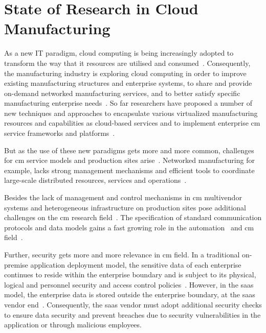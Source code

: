 \documentclass[
a4paper,
twoside,
headsepline,
cleardoublepage=empty,
parskip=half,
draft=false
]{scrbook}
\begin{document}
		\section{State of Research in Cloud Manufacturing}\label{sec:state_of_science_cloud_manufacturing}

			As a new IT paradigm, cloud computing is being increasingly adopted to transform the way that \gls{it} resources are utilised and consumed~\cite{li2010cloud}. 
			Consequently, the manufacturing industry is exploring cloud computing in order to improve existing manufacturing structures and enterprise systems, to
			share and provide on-demand networked manufacturing services, and to better satisfy specific manufacturing enterprise needs~\cite{he2015state}.
			So far researchers have proposed a number of new techniques and approaches to encapsulate various virtualized manufacturing resources and capabilities as cloud-based services and to implement enterprise \gls{cm} service frameworks and platforms~\cite{tao2011cloud}.
			
			But as the use of these new paradigms gets more and more common, challenges for \gls{cm} service models and production sites arise~\cite{brettel2014virtualization}.
			Networked manufacturing for example, lacks strong management mechanisms and efficient tools to coordinate large-scale distributed resources, services and operations~\cite{xu2012cloud}.
			
			Besides the lack of management and control mechanisms in \gls{cm} multivendor systems and heterogeneous infrastructure on production sites pose additional challenges on the \gls{cm} research field~\cite{weyer2015towards}.
			The specification of standard communication protocols and data models gains a fast growing role in the automation~\cite{jazdi2014cyber} and \gls{cm} field~\cite{wollschlaeger2017future}.
			
			Further, security gets more and more relevance in \gls{cm} field.
			In a traditional on-premise application deployment model, the sensitive data of each enterprise continues to reside within the enterprise boundary and is subject to its physical, logical and personnel security and access control policies~\cite{jeschke2017industrial}. 
			However, in the \gls{saas} model, the enterprise data is stored outside the enterprise boundary, at the \gls{saas} vendor end~\cite{subashini2011survey}.
			Consequently, the \gls{saas} vendor must adopt additional security checks to ensure data security and prevent breaches due to security vulnerabilities in the application or through malicious employees.
\end{document}
